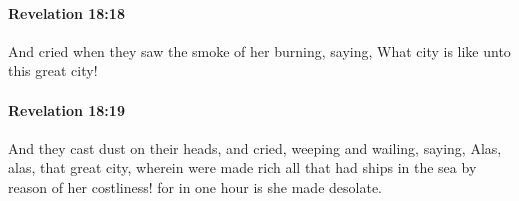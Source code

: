 		\paragraph{Revelation 18:18} %
			\label{REVELATIONNT-18-18}

			And cried when they saw the smoke of her burning, saying, What city is like unto this great city!

			\begin{framed}
			\scriptsize
				\begin{compactdesc}
					\item[SBLG] 
				\end{compactdesc}
			\end{framed}

		\paragraph{Revelation 18:19} %
			\label{REVELATIONNT-18-19}

			And they cast dust on their heads, and cried, weeping and wailing, saying, Alas, alas, that great city, wherein were made rich all that had ships in the sea by reason of her costliness! for in one hour is she made desolate.

